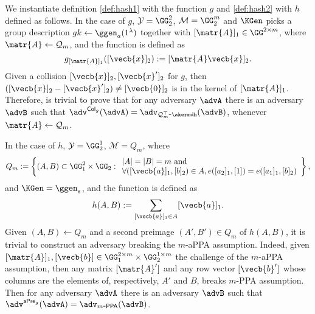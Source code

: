 We instantiate definition \ref{def:hash1} with the function $g$ and \ref{def:hash2}  with $h$ defined as follows. In the case of $g$, $\mathcal{Y}=\GG_2^2$, $\mathcal{M}=\GG_2^m$ and $\KGen$ picks a group description $gk\gets\ggen_a(1^\lambda)$ together with $[\matr{A}]_1\in\GG^{2\times m}$, where $\matr{A}\gets\mathcal{Q}_m$, and the function is defined as
$$
g_{[\matr{A}]_1}([\vecb{x}]_2):= [\matr{A}\vecb{x}]_2.
$$
Given a collision $[\vecb{x}]_2,[\vecb{x}']_2$ for $g$, then $([\vecb{x}]_2-[\vecb{x}']_2)\neq [\vecb{0}]_2$ is in the kernel of $[\matr{A} ]_1$. Therefore, is trivial to prove that for any adversary $\advA$ there is an adversary $\advB$ such that $\adv^{\mathsf{Col}_g}(\advA)=\adv_{\mathcal{Q}_m^\top\mbox{-}\akermdh}(\advB)$, whenever $\matr{A}\gets\mathcal{Q}_m$.


In the case of $h$, $\mathcal{Y}=\GG_2^1$, $\mathcal{M}=Q_m$, where
$$
Q_m := \left\{
(A,B)\subset\GG_1^{2}\times\GG_2:
\begin{array}{l} 
{|A|=|B|=m\text{ and }}\\
{\forall ([\vecb{a}]_1,[b]_2)\in A,e([a_2]_1,[1])=e([a_1]_1,[b]_2)}
\end{array}
\right\},
$$ and $\KGen=\ggen_s$, and the function is defined as
$$
h(A,B):= \sum_{[\vecb{a}]_1\in A}[\vecb{a}]_1.
$$
Given $(A,B)\gets Q_m$ and a second preimage $(A',B')\in Q_m$ of $h(A,B)$, it is trivial to construct an adversary breaking the $m$-aPPA assumption. Indeed, given $[\matr{A}]_1,[\vecb{b}]\in\GG_1^{2\times m}\times \GG_2^{1\times m}$ the challenge of the $m$-aPPA assumption, then any matrix $[\matr{A}']$ and any row vector $[\vecb{b}']$ whose columns are the elements of, respectively, $A'$ and $B$, breaks $m$-PPA assumption. Then for any adversary $\advA$ there is an adversary $\advB$ such that $\adv^{\mathsf{aPre}_g}(\advA)=\adv_{m\mbox{-}\mathsf{PPA}}(\advB)$.


